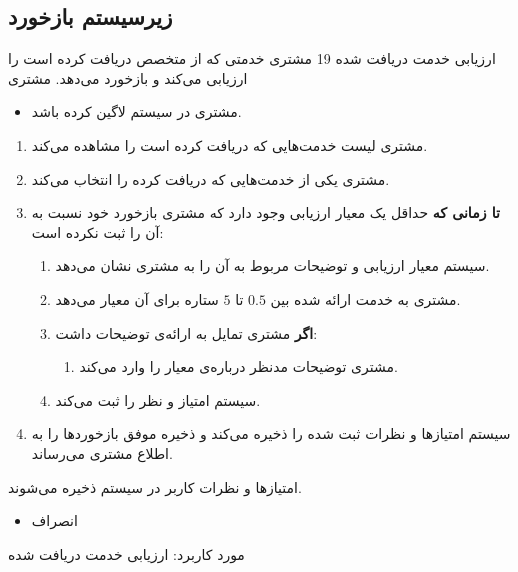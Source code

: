 

\newpage

\subsection{زیرسیستم بازخورد}

{
\usecase
{
	ارزیابی خدمت دریافت شده
}
{19}
{
	مشتری خدمتی که از متخصص دریافت کرده است را ارزیابی می‌کند و بازخورد می‌دهد.
}
{
	مشتری
}
{}
{
		\begin{itemize}
		\vspace*{-0.6cm}
		\item 
		مشتری در سیستم لاگین کرده باشد.
	\end{itemize}
}
{
	\vspace*{-0.6cm}
	\begin{enumerate}
		\item 
		مشتری لیست خدمت‌‌هایی که دریافت کرده است را مشاهده می‌کند.
		\item
		مشتری یکی از خدمت‌هایی که دریافت کرده را انتخاب می‌کند.
		\item
		\textbf{تا زمانی که} حداقل یک معیار ارزیابی وجود دارد که مشتری بازخورد خود نسبت به آن را ثبت نکرده است:
		
		\begin{enumerate}[label=\theenumi.\arabic*.]
			\item
سیستم معیار ارزیابی و توضیحات مربوط به آن را به مشتری نشان می‌دهد.
			\item 
مشتری به خدمت ارائه شده بین $0.5$ تا $5$ ستاره برای آن معیار می‌دهد.
			\item 
			\textbf{اگر} مشتری تمایل به ارائه‌ی توضیحات داشت:
			\begin{enumerate}
				\item 
				مشتری توضیحات مدنظر درباره‌ی معیار را وارد می‌کند. 
			\end{enumerate}
			\item 
			سیستم امتیاز و نظر را ثبت می‌کند.
		\end{enumerate}
		\item
		سیستم امتیازها و نظرات ثبت شده را ذخیره می‌کند و ذخیره موفق بازخوردها را به اطلاع مشتری می‌رساند.
		
	\end{enumerate}
}
{
امتیازها و نظرات کاربر در سیستم ذخیره می‌شوند.
}
{
	\begin{itemize}
		\vspace*{-0.6cm}
		\item 
		انصراف
	\end{itemize}
}
{
	مورد کاربرد: ارزیابی خدمت دریافت شده
}





}
